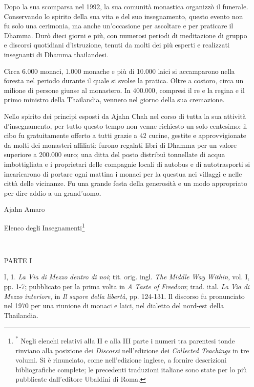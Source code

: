 Dopo la sua scomparsa nel 1992, la sua comunità monastica organizzò il
funerale. Conservando lo spirito della sua vita e del suo insegnamento,
questo evento non fu solo una cerimonia, ma anche un'occasione per
ascoltare e per praticare il Dhamma. Durò dieci giorni e più, con
numerosi periodi di meditazione di gruppo e discorsi quotidiani
d'istruzione, tenuti da molti dei più esperti e realizzati insegnanti di
Dhamma thailandesi.

Circa 6.000 monaci, 1.000 monache e più di 10.000 laici si accamparono
nella foresta nel periodo durante il quale si svolse la pratica. Oltre a
costoro, circa un milione di persone giunse al monastero. In 400.000,
compresi il re e la regina e il primo ministro della Thailandia, vennero
nel giorno della sua cremazione.

Nello spirito dei principi esposti da Ajahn Chah nel corso di tutta la
sua attività d'insegnamento, per tutto questo tempo non venne richiesto
un solo centesimo: il cibo fu gratuitamente offerto a tutti grazie a 42
cucine, gestite e approvvigionate da molti dei monasteri affiliati;
furono regalati libri di Dhamma per un valore superiore a 200.000 euro;
una ditta del posto distribuì tonnellate di acqua imbottigliata e i
proprietari delle compagnie locali di autobus e di autotrasporti si
incaricarono di portare ogni mattina i monaci per la questua nei
villaggi e nelle città delle vicinanze. Fu una grande festa della
generosità e un modo appropriato per dire addio a un grand'uomo.

Ajahn Amaro

Elenco degli Insegnamenti\footnote{\textsuperscript{*} Negli elenchi
  relativi alla II e alla III parte i numeri tra parentesi tonde
  rinviano alla posizione dei \emph{Discorsi} nell'edizione dei
  \emph{Collected Teachings} in tre volumi. Si è rinunciato, come
  nell'edizione inglese, a fornire descrizioni bibliografiche complete;
  le precedenti traduzioni italiane sono state per lo più pubblicate
  dall'editore Ubaldini di Roma.}



PARTE I

I, 1. \emph{La Via di Mezzo dentro di noi}; tit. orig. ingl. \emph{The
Middle Way Within}, vol. I, pp. 1-7; pubblicato per la prima volta in
\emph{A Taste of Freedom}; trad. ital. \emph{La Via di Mezzo interiore},
in \emph{Il sapore della libertà}, pp. 124-131. Il discorso fu
pronunciato nel 1970 per una riunione di monaci e laici, nel dialetto
del nord-est della Thailandia.


